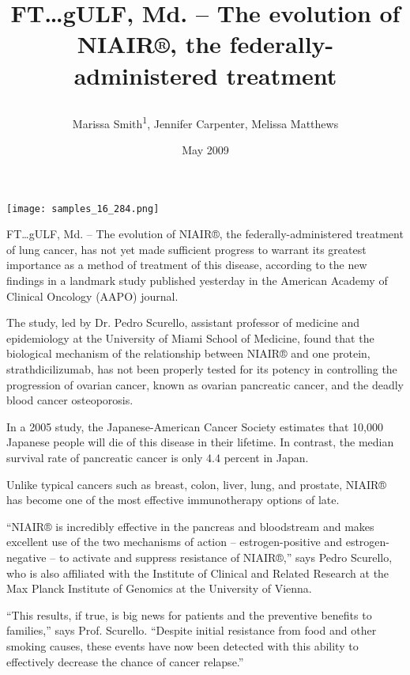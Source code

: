 \documentclass{article}
\title{

FT…gULF, Md. – The evolution of NIAIR®, the federally-administered treatment}
\author{Marissa Smith\textsuperscript{1},  Jennifer Carpenter,  Melissa Matthews}
\affil{\textsuperscript{1}Changsha University of Science and Technology}
\date{May 2009}
\begin{document}
\maketitle

\begin{center}
\begin{minipage}{0.75\linewidth}
\texttt{[image: samples\_16\_284.png]}
\end{minipage}
\end{center}



FT…gULF, Md. – The evolution of NIAIR®, the federally-administered treatment of lung cancer, has not yet made sufficient progress to warrant its greatest importance as a method of treatment of this disease, according to the new findings in a landmark study published yesterday in the American Academy of Clinical Oncology (AAPO) journal.

The study, led by Dr. Pedro Scurello, assistant professor of medicine and epidemiology at the University of Miami School of Medicine, found that the biological mechanism of the relationship between NIAIR® and one protein, strathdicilizumab, has not been properly tested for its potency in controlling the progression of ovarian cancer, known as ovarian pancreatic cancer, and the deadly blood cancer osteoporosis.

In a 2005 study, the Japanese-American Cancer Society estimates that 10,000 Japanese people will die of this disease in their lifetime. In contrast, the median survival rate of pancreatic cancer is only 4.4 percent in Japan.

Unlike typical cancers such as breast, colon, liver, lung, and prostate, NIAIR® has become one of the most effective immunotherapy options of late.

“NIAIR® is incredibly effective in the pancreas and bloodstream and makes excellent use of the two mechanisms of action – estrogen-positive and estrogen-negative – to activate and suppress resistance of NIAIR®,” says Pedro Scurello, who is also affiliated with the Institute of Clinical and Related Research at the Max Planck Institute of Genomics at the University of Vienna.

“This results, if true, is big news for patients and the preventive benefits to families,” says Prof. Scurello. “Despite initial resistance from food and other smoking causes, these events have now been detected with this ability to effectively decrease the chance of cancer relapse.”
\end{document}
